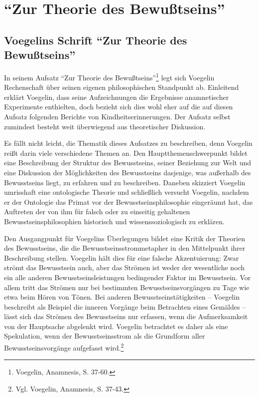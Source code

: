 


\section{"`Zur Theorie des Bewußtseins"'}

\subsection{Voegelins Schrift "`Zur Theorie des Bewußtseins"'}

In seinem Aufsatz "`Zur Theorie des Bewußtseins"'\footnote{Voegelin,
  Anamnesis, S. 37-60.} legt sich Voegelin Rechenschaft über seinen eigenen
philosophischen Standpunkt ab. Einleitend erklärt Voegelin, dass seine
Aufzeichnungen die Ergebnisse anamnetischer Experimente enthielten, doch
bezieht sich dies wohl eher auf die auf diesen Aufsatz folgenden Berichte von
Kindheitserinnerungen. Der Aufsatz selbst zumindest besteht weit überwiegend
aus theoretischer Diskussion.

Es fällt nicht leicht, die Thematik dieses Aufsatzes zu beschreiben,
denn Voegelin reißt darin viele verschiedene Themen an. Den
Hauptthemenschwerpunkt bildet eine Beschreibung der Struktur des
Bewusstseins, seiner Beziehung zur Welt und eine Diskussion der
Möglichkeiten des Bewusstseins dasjenige, was außerhalb des Bewusstseins
liegt, zu erfahren und zu beschreiben. Daneben skizziert Voegelin
umrisshaft eine ontologische Theorie und schließlich versucht Voegelin,
nachdem er der Ontologie das Primat vor der Bewusstseinsphilosophie
eingeräumt hat, das Auftreten der von ihm für falsch oder zu einseitig
gehaltenen Bewusstseinsphilosophien historisch und wissenssoziologisch zu
erklären.

Den Ausgangpunkt für Voegelins Überlegungen bildet eine Kritik der Theorien
des Bewusstseins, die die Bewusstseinsstrommetapher in den Mittelpunkt ihrer
Beschreibung stellen. Voegelin hält dies für eine falsche Akzentuierung: Zwar
strömt das Bewusstsein auch, aber das Strömen ist weder der wesentliche noch
ein alle anderen Bewusstseinsleistungen bedingender Faktor im Bewusstsein. Vor
allem tritt das Strömen nur bei bestimmten Bewusstseinsvorgängen zu Tage wie
etwa beim Hören von Tönen. Bei anderen Bewusstseinstätigkeiten -- Voegelin
beschreibt als Beispiel die inneren Vorgänge beim Betrachten eines Gemäldes --
lässt sich das Strömen des Bewusstseins nur erfassen, wenn die Aufmerksamkeit
von der Hauptsache abgelenkt wird. Voegelin betrachtet es daher als eine
Spekulation, wenn der Bewusstseinsstrom als die Grundform aller
Bewusstseinsvorgänge aufgefasst wird.\footnote{Vgl. Voegelin, Anamnesis,
  S. 37-43.}

